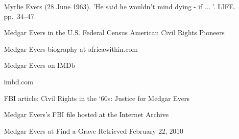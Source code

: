 Myrlie Evers (28 June 1963). 'He said he wouldn't mind dying - if ... '.
LIFE. pp.~34--47.

Medgar Evers in the U.S. Federal Census American Civil Rights Pioneers

Medgar Evers biography at africawithin.com

Medgar Evers on IMDb

imbd.com

FBI article: Civil Rights in the `60s: Justice for Medgar Evers

Medgar Evers's FBI file hosted at the Internet Archive

Medgar Evers at Find a Grave Retrieved February 22, 2010
